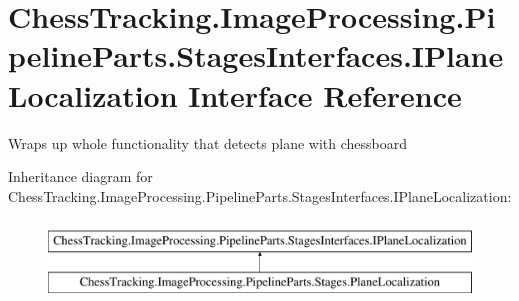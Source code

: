 \hypertarget{interface_chess_tracking_1_1_image_processing_1_1_pipeline_parts_1_1_stages_interfaces_1_1_i_plane_localization}{}\section{Chess\+Tracking.\+Image\+Processing.\+Pipeline\+Parts.\+Stages\+Interfaces.\+I\+Plane\+Localization Interface Reference}
\label{interface_chess_tracking_1_1_image_processing_1_1_pipeline_parts_1_1_stages_interfaces_1_1_i_plane_localization}


Wraps up whole functionality that detects plane with chessboard  


Inheritance diagram for Chess\+Tracking.\+Image\+Processing.\+Pipeline\+Parts.\+Stages\+Interfaces.\+I\+Plane\+Localization\+:\begin{figure}[H]
\begin{center}
\leavevmode
\includegraphics[height=2.000000cm]{interface_chess_tracking_1_1_image_processing_1_1_pipeline_parts_1_1_stages_interfaces_1_1_i_plane_localization}
\end{center}
\end{figure}
